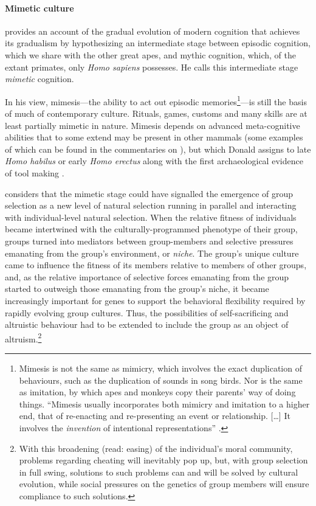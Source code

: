 \documentclass{article}
\begin{document}
\paragraph{Mimetic culture}

\citet{donald1991} provides an account of the gradual evolution of modern
cognition that achieves its gradualism by hypothesizing an intermediate stage
between episodic cognition, which we share with the other great apes, and
mythic cognition, which, of the extant primates, only \textit{Homo sapiens}
possesses. He calls this intermediate stage \textit{mimetic} cognition.

In his view, mimesis---the ability to act out episodic
memories\footnote{Mimesis is not the same as mimicry, which involves the exact
  duplication of behaviours, such as the duplication of sounds in song birds.
  Nor is the same as imitation, by which apes and monkeys copy their parents'
  way of doing things.  “Mimesis usually incorporates both mimicry and
  imitation to a higher end, that of re-enacting and re-presenting an event or
  relationship. [\ldots] It involves the \textit{invention} of intentional
  representations” \citep{donald1991}.}---is still the basis of much of
contemporary culture. Rituals, games, customs and many skills are at least
partially mimetic in nature. Mimesis depends on advanced meta-cognitive
abilities that to some extend may be present in other mammals (some examples
of which can be found in the commentaries on \citealp[pp.~755--756, 768,
771-772]{donald1993}), but which Donald assigns to late \textit{Homo habilus}
or early \textit{Homo erectus} along with the first archaeological evidence of
tool making \citep{donald1991,donald1993}.

\citet[pp.~254, 338]{donald2001} considers that the mimetic stage could have
signalled the emergence of group selection as a new level of natural selection
running in parallel and interacting with individual-level natural selection.
When the relative fitness of individuals became intertwined with the
culturally-programmed phenotype of their group, groups turned into mediators
between group-members and selective pressures emanating from the group's
environment, or \emph{niche}. The group's unique culture came to influence the
fitness of its members relative to members of other groups, and, as the
relative importance of selective forces emanating from the group started to
outweigh those emanating from the group's niche, it became increasingly
important for genes to support the behavioral flexibility required by rapidly
evolving group cultures. Thus, the possibilities of self-sacrificing and
altruistic behaviour had to be extended to include the group as an object of
altruism.\footnote{With this broadening (read: easing) of the individual's
  moral community, problems regarding cheating will inevitably pop up, but,
  with group selection in full swing, solutions to such problems can and will
  be solved by cultural evolution, while social pressures on the genetics of
  group members will ensure compliance to such solutions.}
\end{document}

